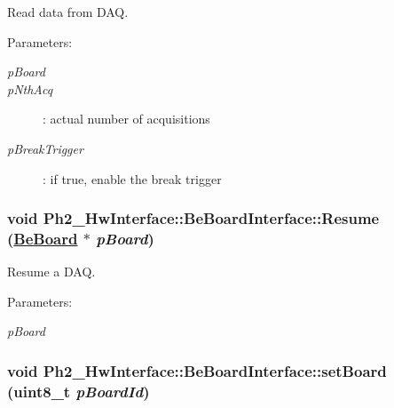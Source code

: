 Read data from DAQ. 

\begin{Desc}
\item[Parameters:]
\begin{description}
\item[{\em p\-Board}]\item[{\em p\-Nth\-Acq}]: actual number of acquisitions \item[{\em p\-Break\-Trigger}]: if true, enable the break trigger \end{description}
\end{Desc}
\hypertarget{class_ph2___hw_interface_1_1_be_board_interface_d21d2651379571889a7a2ebc55ee3223}{
\subsubsection[Resume]{\setlength{\rightskip}{0pt plus 5cm}void Ph2\_\-Hw\-Interface::Be\-Board\-Interface::Resume (\hyperlink{class_ph2___hw_description_1_1_be_board}{Be\-Board} $\ast$ {\em p\-Board})}}
\label{class_ph2___hw_interface_1_1_be_board_interface_d21d2651379571889a7a2ebc55ee3223}


Resume a DAQ. 

\begin{Desc}
\item[Parameters:]
\begin{description}
\item[{\em p\-Board}]\end{description}
\end{Desc}
\hypertarget{class_ph2___hw_interface_1_1_be_board_interface_c4f6fae0f69208acc832437359993665}{
\subsubsection[setBoard]{\setlength{\rightskip}{0pt plus 5cm}void Ph2\_\-Hw\-Interface::Be\-Board\-Interface::set\-Board (uint8\_\-t {\em p\-Board\-Id})}}
\label{class_ph2___hw_interface_1_1_be_board_interface_c4f6fae0f69208acc832437359993665}



